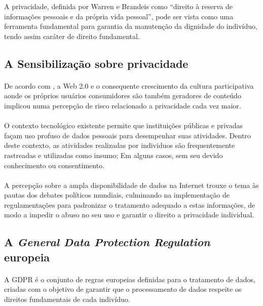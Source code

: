 A privacidade, definida por Warren e Brandeis como ``direito à reserva de informações pessoais e da própria vida pessoal''\cite{warren1890right}, pode ser vista como uma ferramenta fundamental para garantia da manutenção da dignidade do indivíduo, tendo assim caráter de direito fundamental.

\subsection{A Sensibilização sobre privacidade}

\paragraph{} De acordo com \cite{lgpd-evandro}, a Web 2.0 e o consequente crescimento da cultura participativa
aonde os próprios usuários consumidores são também geradores de conteúdo implicou numa percepção de risco relacionado a privacidade cada vez maior.

\paragraph{} O contexto tecnológico existente permite que instituições públicas e privadas façam uso profuso de dados pessoais para desempenhar suas atividades. Dentro deste contexto, as atividades realizadas por individuos são frequentemente rastreadas e utilizadas como insumo; Em alguns casos, sem seu devido conhecimento ou consentimento.

\paragraph{} A percepção sobre a ampla disponibilidade de dados na Internet trouxe o tema às pautas dos debates políticos 
mundiais, culminando na implementação de regulamentações para padronizar o tratamento adequado
a estas informações, de modo a impedir o abuso no seu uso e garantir o direito a privacidade individual.


\subsection{A \textit{General Data Protection Regulation} europeia}

\paragraph{} A GDPR é o conjunto de regras europeias definidas para o tratamento de dados, criadas com o objetivo de garantir que o processamento de dados respeite os direitos fundamentais de cada indivíduo.

